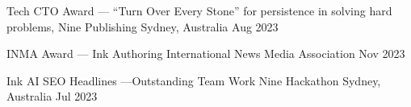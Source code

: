 



\begin{cvhonors}

  \cvhonor
    {Tech CTO Award --- ``Turn Over Every Stone''} %
    {for persistence in solving hard problems, Nine Publishing} %
    {Sydney, Australia} %
    {Aug 2023} %

  \cvhonor
    {INMA Award --- Ink Authoring} %
    {International News Media Association} %
    {} %
    {Nov 2023} %

  \cvhonor
    {Ink AI SEO Headlines ---Outstanding Team Work} %
    {Nine Hackathon} %
    {Sydney, Australia} %
    {Jul 2023} %

\end{cvhonors}

\pagebreak



